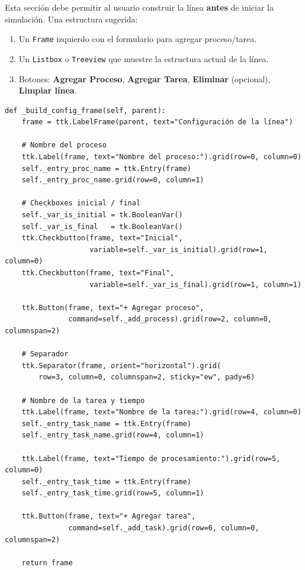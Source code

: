 \documentclass[12pt,letterpaper]{article}
\begin{document}
Esta sección debe permitir al usuario construir la línea \textbf{antes} de
iniciar la simulación. Una estructura sugerida:

\begin{enumerate}[leftmargin=2em]
    \item Un \texttt{Frame} izquierdo con el formulario para agregar
          proceso/tarea.
    \item Un \texttt{Listbox} o \texttt{Treeview} que muestre la estructura
          actual de la línea.
    \item Botones: \textbf{Agregar Proceso}, \textbf{Agregar Tarea},
          \textbf{Eliminar} (opcional), \textbf{Limpiar línea}.
\end{enumerate}

\begin{lstlisting}
def _build_config_frame(self, parent):
    frame = ttk.LabelFrame(parent, text="Configuración de la línea")

    # Nombre del proceso
    ttk.Label(frame, text="Nombre del proceso:").grid(row=0, column=0)
    self._entry_proc_name = ttk.Entry(frame)
    self._entry_proc_name.grid(row=0, column=1)

    # Checkboxes inicial / final
    self._var_is_initial = tk.BooleanVar()
    self._var_is_final   = tk.BooleanVar()
    ttk.Checkbutton(frame, text="Inicial",
                    variable=self._var_is_initial).grid(row=1, column=0)
    ttk.Checkbutton(frame, text="Final",
                    variable=self._var_is_final).grid(row=1, column=1)

    ttk.Button(frame, text="+ Agregar proceso",
               command=self._add_process).grid(row=2, column=0, columnspan=2)

    # Separador
    ttk.Separator(frame, orient="horizontal").grid(
        row=3, column=0, columnspan=2, sticky="ew", pady=6)

    # Nombre de la tarea y tiempo
    ttk.Label(frame, text="Nombre de la tarea:").grid(row=4, column=0)
    self._entry_task_name = ttk.Entry(frame)
    self._entry_task_name.grid(row=4, column=1)

    ttk.Label(frame, text="Tiempo de procesamiento:").grid(row=5, column=0)
    self._entry_task_time = ttk.Entry(frame)
    self._entry_task_time.grid(row=5, column=1)

    ttk.Button(frame, text="+ Agregar tarea",
               command=self._add_task).grid(row=6, column=0, columnspan=2)

    return frame


\end{lstlisting}
\end{document}
